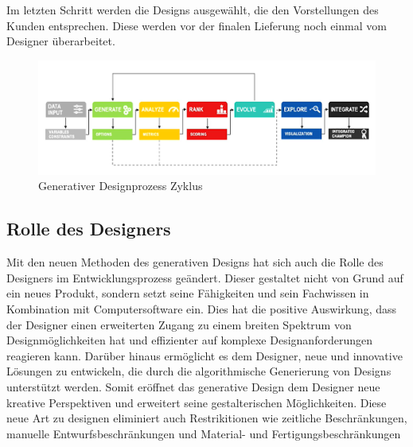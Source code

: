 Im letzten Schritt werden die Designs ausgewählt, die den Vorstellungen des Kunden entsprechen. Diese werden vor der finalen Lieferung noch einmal vom Designer überarbeitet. \autocite{12} \autocite{15} \autocite*{16}


\begin{figure}[h]
  \centering
  \begin{minipage}{0.5\textwidth}
    \centering
    \includegraphics[width=\textwidth]{./images/7stepDesignProzess.png}
  \end{minipage}
  \caption{Generativer Designprozess Zyklus}
  \label{fig:designprozess}
\end{figure}

\subsection*{Rolle des Designers}

Mit den neuen Methoden des generativen Designs hat sich auch die Rolle des Designers im Entwicklungsprozess geändert. Dieser gestaltet nicht von Grund auf ein neues Produkt, sondern setzt seine Fähigkeiten und sein Fachwissen in Kombination mit Computersoftware ein. Dies hat die positive Auswirkung, dass der Designer einen erweiterten Zugang zu einem breiten Spektrum von Designmöglichkeiten hat und effizienter auf komplexe Designanforderungen reagieren kann. Darüber hinaus ermöglicht es dem Designer, neue und innovative Lösungen zu entwickeln, die durch die algorithmische Generierung von Designs unterstützt werden. Somit eröffnet das generative Design dem Designer neue kreative Perspektiven und erweitert seine gestalterischen Möglichkeiten. Diese neue Art zu designen eliminiert auch Restrikitionen wie zeitliche Beschränkungen, manuelle Entwurfsbeschränkungen und Material- und Fertigungsbeschränkungen \autocite*{16}